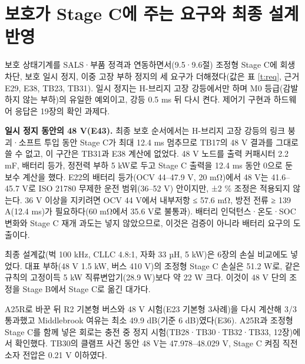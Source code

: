 \section{보호가 Stage C에 주는 요구와 최종 설계 반영}

보호 상태기계를 SALS·부품 정격과 연동하면서(9.5·9.6절) 조정형 Stage C에 회생 차단, 보호 일시 정지, 이중 고장 부하 정지의 세 요구가 더해졌다(값은 표 \ref{t:req}, 근거 E29, E38, TB23, TB31). 일시 정지는 H-브리지 고장 강등에서만 하며 M0 등급(감발하지 않는 부하)의 유일한 예외이고, 강등 0.5 ms 뒤 다시 켠다. 제어기 구현과 하드웨어 응답은 19장의 확인 과제다.


\textbf{일시 정지 동안의 48 V(E43).} 최종 보호 순서에서는 H-브리지 고장 강등의 링크 붕괴·소프트 투입 동안 Stage C가 최대 12.4 ms 멈추므로 TB17의 48 V 결과를 그대로 쓸 수 없고, 이 구간은 TB31과 E38 계산에 없었다. 48 V 노드를 출력 커패시터 2.2 mF, 배터리 등가, 정전력 부하 5 kW로 두고 Stage C 출력을 12.4 ms 동안 0으로 둔 보수 계산을 했다. E22의 배터리 등가(OCV 44–47.9 V, 20 mΩ)에서 48 V는 41.6–45.7 V로 ISO 21780 무제한 운전 범위(36–52 V) 안이지만, ±2 \% 조정은 적용되지 않는다. 36 V 이상을 지키려면 OCV 44 V에서 내부저항 ≤ 57.6 mΩ, 방전 전류 ≥ 139 A(12.4 ms)가 필요하다(60 mΩ에서 35.6 V로 불통과). 배터리 인덕턴스·온도·SOC 변화와 Stage C 재개 과도는 넣지 않았으므로, 이것은 검증이 아니라 배터리 요구의 도출이다.

최종 설계값(벅 100 kHz, CLLC 4.8:1, 자화 33 µH, 5 kW)은 6장의 손실 비교에도 넣었다. 대표 부하(48 V 1.5 kW, 버스 410 V)의 조정형 Stage C 손실은 51.2 W로, 같은 규칙의 고정이득 5 kW 직류변압기(28.9 W)보다 약 22 W 크다. 이것이 48 V 단의 조정을 Stage B에서 Stage C로 옮긴 대가다.

A25R로 바꾼 뒤 R2 기본형 버스와 48 V 시험(E23 기본형 3사례)을 다시 계산해 3/3 통과했고 Middlebrook 여유는 최소 49.9 dB(기준 6 dB)였다(E36). A25R과 조정형 Stage C를 함께 넣은 회로는 충전 중 정지 시험(TB28·TB30·TB32·TB33, 12장)에서 확인했다. TB30의 클램프 사건 동안 48 V는 47.978–48.029 V, Stage C 켜짐 직전 소자 전압은 0.21 V 이하였다.
